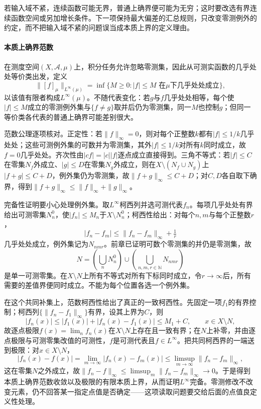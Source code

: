 若输入域不紧，连续函数可能无界，普通上确界便可能为无穷；这时要改选有界连续函数空间或另加增长条件。下一项保持最大偏差的汇总规则，只改变零测例外的约定，而不把输入域不紧的问题误当成本质上界的定义理由。

\paragraph{本质上确界范数}

在测度空间$(X,\mathcal A,\mu)$上，积分任务允许忽略零测集，因此从可测实函数的几乎处处等价类出发，定义
\[
  \|[f]_\mu\|_{L^\infty(\mu)}
  =\inf\{M\ge0:|f|\le M\text{ 在$\mu$下几乎处处成立}\},
\]
以该值有限者构成$L^\infty(\mu)$。不随代表变化：若$g$与$f$几乎处处相等，每个使$|f|\le M$成立的零测例外集与$\{f\neq g\}$取并后仍为零测集，同一$M$也控制$g$；但同一等价类各代表的普通上确界可能差别很大。

范数公理逐项核对。正定性：若$\|f\|_\infty=0$，则对每个正整数$k$都有$|f|\le1/k$几乎处处；这些可测例外集的可数并为零测集，其外$|f|\le1/k$对所有$k$同时成立，故$f=0$几乎处处。齐次性由$|cf|=|c||f|$逐点成立直接得到。三角不等式：若$|f|\le C$在零集$N_f$外成立、$|g|\le D$在零集$N_g$外成立，则在$X\setminus(N_f\cup N_g)$上$|f+g|\le C+D$，例外集仍为零测集，故$\|f+g\|_\infty\le C+D$；对$C,D$各自取下确界，得到$\|f+g\|_\infty\le\|f\|_\infty+\|g\|_\infty$。

完备性证明要小心处理例外集。取$L^\infty$柯西列并选可测代表$f_n$。每项几乎处处有界给出可测零集$N_n^0$，使$|f_n|\le M_n$于$X\setminus N_n^0$；柯西性给出：对每个$n,m$与每个正整数$r$，
\[
  |f_n-f_m|\le\|f_n-f_m\|_\infty+\tfrac1r
\]
几乎处处成立，例外集记为$N_{nmr}$。前章已证明可数个零测集的并仍是零测集，故
\[
  N=\left(\bigcup_n N_n^0\right)\cup\left(\bigcup_{n,m,r\in\mathbb N}N_{nmr}\right)
\]
是单一可测零集。在$X\setminus N$上所有不等式对所有下标同时成立，令$r\to\infty$后，所有需要的差值界便同时成立。不能为每个位置各选一个例外集。

在这个共同补集上，范数柯西性给出了真正的一致柯西性。先固定一项$f_1$的有界控制；柯西列$\{\|f_n-f_1\|_\infty\}$有界，设其上界为$C$，则
\[
  |f_n(x)|\le|f_1(x)|+|f_n(x)-f_1(x)|\le M_1+C,\qquad x\in X\setminus N,
\]
故逐点极限$f(x)=\lim_n f_n(x)$在$X\setminus N$上存在且一致有界；在$N$上补零，并由逐点极限与可测零集改值的可测性，$f$是可测代表且$f\in L^\infty$。把共同柯西界的一端送到极限：对$x\in X\setminus N$，
\[
  |f_n(x)-f(x)|=\lim_{m\to\infty}|f_n(x)-f_m(x)|
  \le\limsup_{m\to\infty}\|f_n-f_m\|_\infty,
\]
这在零集$N$之外成立，故$\|f_n-f\|_\infty\le\limsup_m\|f_n-f_m\|_\infty\to0$。于是得到本质上确界范数收敛以及极限的有限本质上界，从而证明$L^\infty$完备。零测修改不改变元素，仍不回答某一指定点值是否确定——这项读取问题要交给后面的点值良定义性处理。

